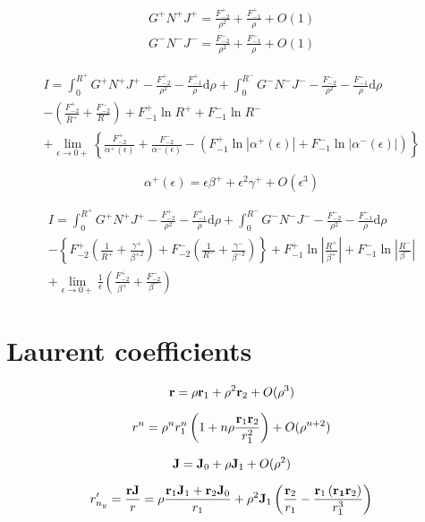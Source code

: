 \documentclass[a4paper,11pt]{article}
\newcommand{\td}{\mathrm{d}}
\begin{document}
\begin{align}
G^+ N^+ J^+ = \frac{F_{-2}^+}{\rho^2} + \frac{F_{-1}^+}{\rho} + O(1) \nonumber \\
G^- N^- J^- = \frac{F_{-2}^-}{\rho^2} + \frac{F_{-1}^-}{\rho} + O(1)
\end{align}

\begin{multline}
I =
\int_{0}^{R^+} G^+ N^+ J^+ - \frac{F_{-2}^+}{\rho^2} - \frac{F_{-1}^+}{\rho} \td \rho +
\int_{0}^{R^-} G^- N^- J^- - \frac{F_{-2}^-}{\rho^2} - \frac{F_{-1}^-}{\rho} \td \rho \\
-
\left(
\frac{F_{-2}^+}{R^+}
+ \frac{F_{-2}^-}{R^-} 
\right)
+ F_{-1}^+ \ln R^+
+ F_{-1}^- \ln R^- \\
+
\lim_{\epsilon \to 0+}
\left\{
\frac{F_{-2}^+}{\alpha^+(\epsilon)}
+ \frac{F_{-2}^-}{\alpha^-(\epsilon)}
- \left(F_{-1}^+ \ln \left|\alpha^+(\epsilon) \right|
+ F_{-1}^- \ln \left|\alpha^-(\epsilon) \right|\right)
\right\}
\end{multline}

\begin{equation}
\alpha^+(\epsilon) =  \epsilon \beta^+ + \epsilon^2 \gamma^+ + O(\epsilon^3)
\end{equation}

\begin{multline}
I =
\int_{0}^{R^+} G^+ N^+ J^+ - \frac{F_{-2}^+}{\rho^2} - \frac{F_{-1}^+}{\rho} \td \rho +
\int_{0}^{R^-} G^- N^- J^- - \frac{F_{-2}^-}{\rho^2} - \frac{F_{-1}^-}{\rho} \td \rho \\
-
\left\{
F_{-2}^+\left(\frac{1}{R^+} + \frac{\gamma^+}{\beta^{+2}}\right)
+
F_{-2}^-\left(\frac{1}{R^-} + \frac{\gamma^-}{\beta^{-2}}\right)
\right\}
+ F_{-1}^+ \ln \left|\frac{R^+}{\beta^+}\right|
+ F_{-1}^- \ln \left|\frac{R^-}{\beta^-}\right| \\
+
\lim_{\epsilon \to 0+}
\frac{1}{\epsilon}
\left(
\frac{F_{-2}^+}{\beta^+}
+ \frac{F_{-2}^-}{\beta^-}
\right)
\end{multline}

\section{Laurent coefficients}

\begin{equation}
	{\bf r} = \rho {\bf r}_1 + \rho^2 {\bf r}_2 + O(\rho^3)
\end{equation}

\begin{equation}
	r^n = \rho^n r_1^n \left(1 + n \rho \frac{{\bf r}_1 {\bf r}_2}{r_1^2} \right) + O(\rho^{n+2})
\end{equation}

\begin{equation}
	{\bf J} = {\bf J}_0 + \rho {\bf J}_1 + O(\rho^2)
\end{equation}

\begin{equation}
	r'_{n_y} = \frac{{\bf r} {\bf J}}{r}
	= 
	\rho \frac{{\bf r}_1 {\bf J}_1 + {\bf r}_2 {\bf J}_0}{r_1}
	+ \rho^2 {\bf J}_1
	\left(
		\frac{{\bf r}_2}{r_1} - \frac{{\bf r}_1 \left({\bf r_1} {\bf r}_2\right)}{r_1^3}
	\right)
\end{equation}
\end{document}
